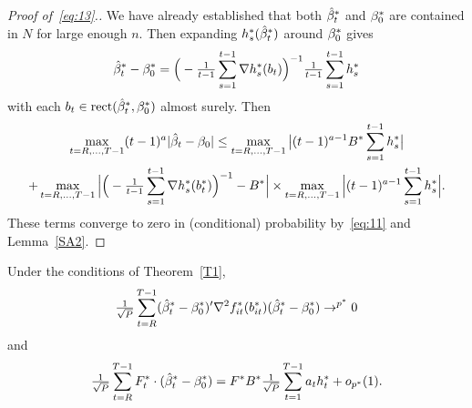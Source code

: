 \documentclass[12pt,fleqn]{article}
\begin{document}
\begin{proof}[Proof of~\eqref{eq:13}.]
We have already established that both $\hat \beta_t^*$ and $\beta_0^*$
are contained in $N$ for large enough $n$. Then expanding
$h_s^*(\hat \beta_t^*)$ around $\beta_0^*$ gives
\begin{equation*}
  \hat \beta_t^* - \beta_0^* =
  \Big(- \tfrac{1}{t-1} \sum_{s=1}^{t-1} \nabla h_s^*(b_t) \Big)^{-1}
  \tfrac{1}{t-1} \sum_{s=1}^{t-1} h_s^*
\end{equation*}
with each $b_t \in \operatorname{rect}(\hat \beta_t^*, \beta_0^*)$ almost surely. Then
\begin{multline}
  \max_{t=R,\dots,T-1} (t-1)^a | \hat{\beta}_t - \beta_0 |
  \leq \max_{t=R,\dots,T-1} \big| (t-1)^{a-1} B^* \sum_{s=1}^{t-1} h_s^* \big| \\
  + \max_{t=R,\dots,T-1} \Big| \Big(
  - \tfrac{1}{t-1} \sum_{s=1}^{t-1} \nabla h_s^*(b_t^*) \Big)^{-1} - B^* \Big|
  \times \max_{t=R,\dots,T-1} \Big| (t-1)^{a-1} \sum_{s=1}^{t-1} h_s^* \Big|.
\end{multline}
These terms converge to zero in (conditional) probability by~\eqref{eq:11}
and Lemma~\ref{SA2}.
\end{proof}

\begin{lema}\label{SA4}
  Under the conditions of Theorem~\ref{T1},
  \begin{equation}\label{eq:16}
    \tfrac{1}{\sqrt{P}} \sum_{t=R}^{T-1} (\hat \beta_t^* - \beta_0^*)' \nabla^2 f_{it}^*(b_{it}^*) (\hat \beta_t^* - \beta_0^*) \to^{p^*} 0
  \end{equation}
  and
  \begin{equation}\label{eq:17}
    \tfrac{1}{\sqrt{P}} \sum_{t=R}^{T-1} F_t^* \cdot (\hat \beta_t^* - \beta_0^*)
    = F^* B^* \tfrac{1}{\sqrt{P}} \sum_{t=1}^{T-1} a_t h_t^* + o_{p^*}(1).
  \end{equation}
\end{lema}
\end{document}
